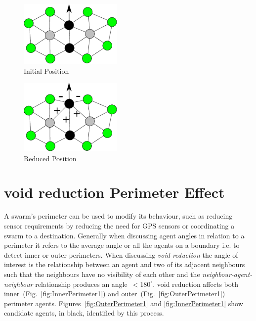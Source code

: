 \documentclass[preprint,12pt]{elsarticle}
\begin{document}
\begin{figure}
\begin{center}
\includegraphics[width=5cm]{figures/InterAgentEffect1}
\end{center}
\caption{Initial Position\label{fig:InterAgentEffect1}}
\end{figure}

\begin{figure}
\begin{center}
\includegraphics[width=5cm]{figures/InterAgentEffect2}
\end{center}
\caption{Reduced Position\label{fig:InterAgentEffect2}}
\end{figure}

\section{void reduction Perimeter Effect}\label{sec:ConcaveReductionPerimeterEffect}
A swarm's perimeter can be used to modify its behaviour, such as reducing sensor requirements by reducing the need for GPS sensors or coordinating a swarm to a destination. Generally when discussing agent angles in relation to a perimeter it refers to the average angle or all the agents on a boundary i.e. to detect inner or outer perimeters. When discussing \textit{void reduction} the angle of interest is the relationship between an agent and two of its adjacent neighbours such that the neighbours have no visibility of each other and the \textit{neighbour-agent-neighbour} relationship produces an angle~$< 180^\circ$. void reduction affects both inner~(Fig.~\ref{fig:InnerPerimeter1}) and outer~(Fig.~\ref{fig:OuterPerimeter1}) perimeter agents. Figures~\ref{fig:OuterPerimeter1} and \ref{fig:InnerPerimeter1} show candidate agents, in black, identified by this process. 
\end{document}
